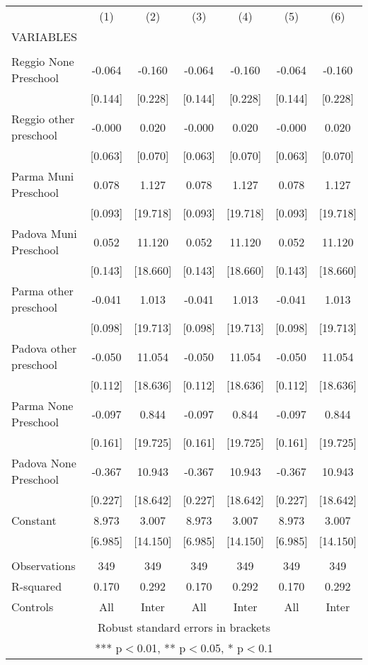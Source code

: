 \begin{tabular}{lcccccc} \hline
 & (1) & (2) & (3) & (4) & (5) & (6) \\
VARIABLES &  &  &  &  &  &  \\ \hline
 &  &  &  &  &  &  \\
Reggio None Preschool & -0.064 & -0.160 & -0.064 & -0.160 & -0.064 & -0.160 \\
 & [0.144] & [0.228] & [0.144] & [0.228] & [0.144] & [0.228] \\
Reggio other preschool & -0.000 & 0.020 & -0.000 & 0.020 & -0.000 & 0.020 \\
 & [0.063] & [0.070] & [0.063] & [0.070] & [0.063] & [0.070] \\
Parma Muni Preschool & 0.078 & 1.127 & 0.078 & 1.127 & 0.078 & 1.127 \\
 & [0.093] & [19.718] & [0.093] & [19.718] & [0.093] & [19.718] \\
Padova Muni Preschool & 0.052 & 11.120 & 0.052 & 11.120 & 0.052 & 11.120 \\
 & [0.143] & [18.660] & [0.143] & [18.660] & [0.143] & [18.660] \\
Parma other preschool & -0.041 & 1.013 & -0.041 & 1.013 & -0.041 & 1.013 \\
 & [0.098] & [19.713] & [0.098] & [19.713] & [0.098] & [19.713] \\
Padova other preschool & -0.050 & 11.054 & -0.050 & 11.054 & -0.050 & 11.054 \\
 & [0.112] & [18.636] & [0.112] & [18.636] & [0.112] & [18.636] \\
Parma None Preschool & -0.097 & 0.844 & -0.097 & 0.844 & -0.097 & 0.844 \\
 & [0.161] & [19.725] & [0.161] & [19.725] & [0.161] & [19.725] \\
Padova None Preschool & -0.367 & 10.943 & -0.367 & 10.943 & -0.367 & 10.943 \\
 & [0.227] & [18.642] & [0.227] & [18.642] & [0.227] & [18.642] \\
Constant & 8.973 & 3.007 & 8.973 & 3.007 & 8.973 & 3.007 \\
 & [6.985] & [14.150] & [6.985] & [14.150] & [6.985] & [14.150] \\
 &  &  &  &  &  &  \\
Observations & 349 & 349 & 349 & 349 & 349 & 349 \\
R-squared & 0.170 & 0.292 & 0.170 & 0.292 & 0.170 & 0.292 \\
 Controls & All & Inter & All & Inter & All & Inter \\ \hline
\multicolumn{7}{c}{ Robust standard errors in brackets} \\
\multicolumn{7}{c}{ *** p$<$0.01, ** p$<$0.05, * p$<$0.1} \\
\end{tabular}
